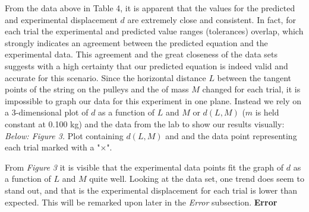 \documentclass[12pt,letterpaper]{article}
\begin{document}
{{{{\begin{table}[h]
\end{table}
\newline
}
From the data above in Table 4, it is apparent that the values for the predicted and experimental displacement \(d\) are extremely close and consistent. In fact, for each trial the experimental and predicted value ranges (tolerances) overlap, which strongly indicates an agreement between the predicted equation and the experimental data. This agreement and the great closeness of the data sets suggests with a high certainty that our predicted equation is indeed valid and accurate for this scenario. 
\newline\newline
Since the horizontal distance \(L\) between the tangent points of the string on the pulleys and the of mass \(M\) changed for each trial, it is impossible to graph our data for this experiment in one plane. Instead we rely on a 3-dimensional plot of \(d\) as a function of \(L\) and \(M\) or \(d(L,M)\) (\(m\) is held constant at 0.100 kg) and the data from the lab to show our results visually:
\newline\newline\textit{Below: Figure 3.} Plot containing \(d(L,M)\) and and the data point representing each trial marked with a "\(\times\)".
\vspace{-.4in}
\begin {figure}[htb!]
  \begin{center}
    	\resizebox{0.6\textwidth}{!}{}
  \end	{center}
\end {figure}
\newpage
\hspace{-16.5pt}From \textit{Figure 3} it is visible that the experimental data points fit the graph of \(d\) as a function of \(L\) and \(M\) quite well. Looking at the data set, one trend does seem to stand out, and that is the experimental displacement for each trial is lower than expected. This will be remarked upon later in the \textit{Error} subsection.
\newline\newline
\textbf{Error}
\newline
}}}
\end{document}
